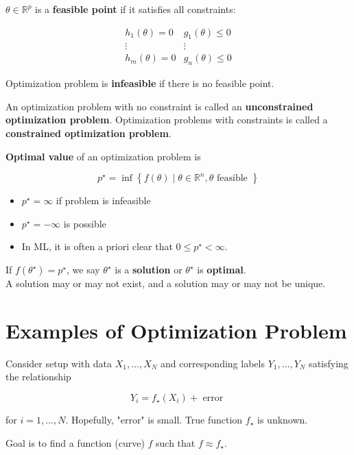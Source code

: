 \documentclass{report}
\begin{document}
\begin{definition}
    $\theta \in \mathbb{R}^{p}$ is a \textbf{feasible point} if it satisfies all constraints:

    $$
    \begin{array}{cc}
    h_{1}(\theta)=0 & g_{1}(\theta) \leq 0 \\
    \vdots & \vdots \\
    h_{m}(\theta)=0 & g_{n}(\theta) \leq 0
    \end{array}
    $$

    Optimization problem is \textbf{infeasible} if there is no feasible point.

    An optimization problem with no constraint is called an \textbf{unconstrained optimization problem}. Optimization problems with constraints is called a \textbf{constrained optimization problem}.
\end{definition}

\begin{definition}
    \textbf{Optimal value} of an optimization problem is

    $$
    p^{\star}=\inf \left\{f(\theta) \mid \theta \in \mathbb{R}^{n}, \theta \text { feasible }\right\}
    $$

    \begin{itemize}
        \item $p^{\star}=\infty$ if problem is infeasible
        \item $p^{\star}=-\infty$ is possible
        \item In ML, it is often a priori clear that $0 \leq p^{\star}<\infty$.
    \end{itemize}

    If $f\left(\theta^{\star}\right)=p^{\star}$, we say $\theta^{\star}$ is a \textbf{solution} or $\theta^{\star}$ is \textbf{optimal}.\\
    A solution may or may not exist, and a solution may or may not be unique.
\end{definition}

\section{Examples of Optimization Problem}

\begin{example}
    Consider setup with data $X_{1}, \ldots, X_{N}$ and corresponding labels $Y_{1}, \ldots, Y_{N}$ satisfying the relationship

    $$
    Y_{i}=f_{\star}\left(X_{i}\right)+\text { error }
    $$

    for $i=1, \ldots, N$. Hopefully, "error" is small. True function $f_{\star}$ is unknown.

    Goal is to find a function (curve) $f$ such that $f \approx f_{\star}$.
\end{example}
\end{document}
